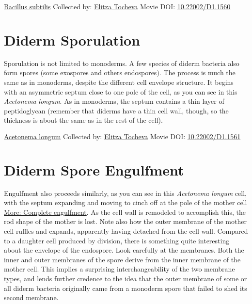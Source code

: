 \documentclass[]{tufte-book}
\begin{document}
\label{fig:8-8}\protect\hyperlink{tree}{Bacillus subtilis} Collected by: \protect\hyperlink{elitza_tocheva}{Elitza Tocheva} Movie DOI: \href{https://doi.org/10.22002/D1.1560}{10.22002/D1.1560}

\hypertarget{diderm-sporulation}{%
\section{Diderm Sporulation}\label{diderm-sporulation}}

Sporulation is not limited to monoderms. A few species of diderm bacteria also form spores (some exospores and others endospores). The process is much the same as in monoderms, despite the different cell envelope structure. It begins with an asymmetric septum close to one pole of the cell, as you can see in this \emph{Acetonema longum}. As in monoderms, the septum contains a thin layer of peptidoglycan (remember that diderms have a thin cell wall, though, so the thickness is about the same as in the rest of the cell).



\hypertarget{htmlwidget-aa1add37ebbaf34057d8}{}

\label{fig:8-9}\protect\hyperlink{tree}{Acetonema longum} Collected by: \protect\hyperlink{elitza_tocheva}{Elitza Tocheva} Movie DOI: \href{https://doi.org/10.22002/D1.1561}{10.22002/D1.1561}

\hypertarget{diderm-spore-engulfment}{%
\section{Diderm Spore Engulfment}\label{diderm-spore-engulfment}}

Engulfment also proceeds similarly, as you can see in this \emph{Acetonema longum} cell, with the septum expanding and moving to cinch off at the pole of the mother cell \protect\hyperlink{Complete_engulfment}{More: Complete engulfment}. As the cell wall is remodeled to accomplish this, the rod shape of the mother is lost. Note also how the outer membrane of the mother cell ruffles and expands, apparently having detached from the cell wall. Compared to a daughter cell produced by division, there is something quite interesting about the envelope of the endospore. Look carefully at the membranes. Both the inner and outer membranes of the spore derive from the inner membrane of the mother cell. This implies a surprising interchangeability of the two membrane types, and lends further credence to the idea that the outer membrane of some or all diderm bacteria originally came from a monoderm spore that failed to shed its second membrane.
\end{document}
